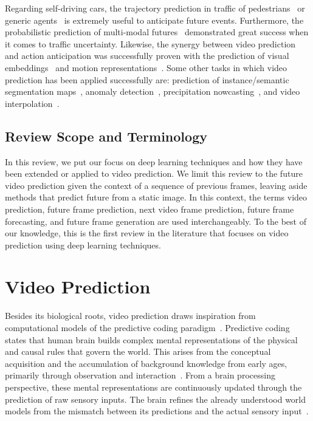 Regarding self-driving cars, the trajectory prediction in traffic of pedestrians~\cite{Bhattacharyya2018} or generic agents~\cite{Choi2020} is extremely useful to anticipate future events. Furthermore, the probabilistic prediction of multi-modal futures~\cite{Hu2020} demonstrated great success when it comes to traffic uncertainty. Likewise, the synergy between video prediction and action anticipation was successfully proven with the prediction of visual embeddings~\cite{Gammulle2019} and motion representations~\cite{Opazo2018}. Some other tasks in which video prediction has been applied successfully are: prediction of instance/semantic segmentation maps~\cite{Luc2018,Bhattacharyya2019,Terwilliger2019}, anomaly detection~\cite{Liu2018a}, precipitation nowcasting~\cite{Shi2015,Shi2017}, and video interpolation~\cite{Liu2017}.

\subsection{Review Scope and Terminology}
In this review, we put our focus on deep learning techniques and how they have been extended or applied to video prediction. We limit this review to the future video prediction given the  context of a sequence of previous frames, leaving aside methods that predict future from a static image. In this context, the terms
video prediction, future frame prediction, next video frame prediction, future frame forecasting, and future frame generation are used interchangeably. To the best of our knowledge, this is the first review in the literature that focuses on video prediction using deep learning techniques.


\section{Video Prediction}
\label{sec:video_prediction}
Besides its biological roots, video prediction draws inspiration from computational models of the predictive coding paradigm~\cite{Softky1995,Rao1999,Deco2001,Hollingworth2004}. Predictive coding states that human brain builds complex mental representations of the physical and causal rules that govern the world. This arises from the conceptual acquisition and the accumulation of background knowledge from early ages, primarily through observation and interaction~\cite{Cleeremans1991,Cleeremans1993,Baker2014}. From a brain processing perspective, these mental representations are continuously updated through the prediction of raw sensory inputs. The brain refines the already understood world models from the mismatch between its predictions and the actual sensory input~\cite{Ouden2012}.

